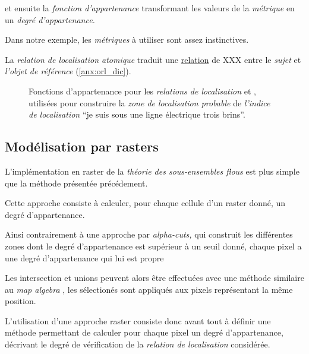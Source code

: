 et ensuite la \emph{fonction d'appartenance} transformant les valeurs de la
\emph{métrique} en un \emph{degré d'appartenance.}

Dans notre exemple, les \emph{métriques} à utiliser sont assez
instinctives.

La \emph{relation de localisation atomique}
 traduit
une \underline{relation} de XXX entre le \emph{sujet} et \emph{l'objet de
  référence} (\autoref{anx:orl_dic}).


\begin{figure}
  \centering
  \subfloat{%
    
    \label{fig:fnc_app_AltInf}
  }
  \hfill%
  \subfloat{%
    
    \label{fig:fnc_app_Dist}
  }
  \caption{Fonctions d'appartenance pour les \emph{relations de
      localisation}
    \protect{}
    et
    \protect{},
    utilisées pour construire la \emph{zone de localisation probable}
    de \emph{l'indice de localisation} \enquote{je suis sous une ligne
      électrique trois brins}.}
  \label{fig:fnc_app_sousProche}
\end{figure}

\subsection{Modélisation par rasters}

L'implémentation en raster de la \emph{théorie des sous-ensembles
  flous} est plus simple que la méthode présentée précédement.

Cette approche consiste à calculer, pour chaque cellule d'un raster
donné, un degré d'appartenance.

Ainsi contrairement à une approche par \emph{alpha-cuts,} qui
construit les différentes zones dont le degré d'appartenance est
supérieur à un seuil donné, chaque pixel a une degré d'appartenance
qui lui est propre 

Les intersection et unions peuvent alors être effectuées avec une
méthode similaire au \emph{map algebra} \autocite{XX}, les sélectionés
sont appliqués aux pixels représentant la même position.


L'utilisation d'une approche raster consiste donc avant tout à définir
une méthode permettant de calculer pour chaque pixel un degré
d'appartenance, décrivant le degré de vérification de la
\emph{relation de localisation} considérée.

